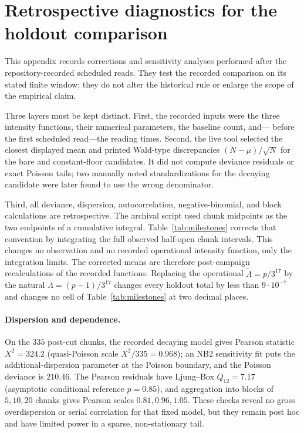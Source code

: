 \section{Retrospective diagnostics for the holdout comparison}
\label{s:densitydiagnostics}

This appendix records corrections and sensitivity analyses performed after
the repository-recorded scheduled reads. They test the recorded comparison on its
stated finite window; they do not alter the historical rule or enlarge the
scope of the empirical claim.

\begin{remark}\label{r:sigma}
Three layers must be kept distinct. First, the recorded inputs were the three
intensity functions, their numerical parameters, the baseline count, and---
before the first scheduled read---the reading times.  Second, the live tool
selected the closest displayed mean and printed Wald-type discrepancies
$(N-\mu)/\sqrt{N}$ for the bare and constant-floor candidates.  It did not
compute deviance residuals or exact Poisson tails; two manually noted
standardizations for the decaying candidate were later found to use the wrong
denominator.

Third, all deviance, dispersion, autocorrelation, negative-binomial, and block
calculations are retrospective.  The archival script used chunk midpoints as
the two endpoints of a cumulative integral.  Table~\ref{tab:milestones}
corrects that convention by integrating the full observed half-open chunk
intervals. This changes no observation and no recorded operational intensity
function, only the integration limits.  The corrected means are therefore
post-campaign recalculations of the recorded functions. Replacing the
operational $\widetilde\Lambda=p/3^{17}$ by the natural
$\Lambda=(p-1)/3^{17}$ changes every holdout total by less than
$9\cdot10^{-7}$ and changes no cell of Table~\ref{tab:milestones} at two
decimal places.
\end{remark}

\paragraph{Dispersion and dependence.}
On the $335$ post-cut chunks, the recorded decaying model gives Pearson
statistic $X^2=324.2$ (quasi-Poisson scale $X^2/335=0.968$); an NB2 sensitivity
fit puts the additional-dispersion parameter at the Poisson boundary, and the
Poisson deviance is $210.46$.  The Pearson residuals have Ljung--Box
$Q_{12}=7.17$ (asymptotic conditional reference $p=0.85$), and aggregation into
blocks of $5,10,20$ chunks gives Pearson scales $0.81,0.96,1.05$.  These checks
reveal no gross overdispersion or serial correlation for that fixed model, but
they remain post hoc and have limited power in a sparse, non-stationary tail.

